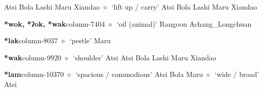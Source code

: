          Atsi 
\hspace{1ex}
         Bola 
\hspace{1ex}
         Lashi 
\hspace{1ex}
         Maru 
\hspace{1ex}
         Xiandao 
\hspace{1ex}
         $\diamond$~`lift up / carry'
         Atsi 
\hspace{1ex}
         Bola 
\hspace{1ex}
         Lashi 
\hspace{1ex}
         Maru 
\hspace{1ex}
         Xiandao 
  \item {\footnotesize \textbf{*wok, *ʔok, *wak}}{\tiny column-7404}
         $\diamond$~`oil (animal)'
         Rangoon 
\hspace{1ex}
         Achang\_Longchuan 
  \item {\footnotesize \textbf{*lak}}{\tiny column-8037}
         $\diamond$~`pestle'
         Maru 
  \item {\footnotesize \textbf{*wak}}{\tiny column-9920}
         $\diamond$~`shoulder'
         Atsi 
\hspace{1ex}
         Atsi 
\hspace{1ex}
         Bola 
\hspace{1ex}
         Lashi 
\hspace{1ex}
         Maru 
\hspace{1ex}
         Xiandao 
  \item {\footnotesize \textbf{*lam}}{\tiny column-10370}
         $\diamond$~`spacious / commodious'
         Atsi 
\hspace{1ex}
         Bola 
\hspace{1ex}
         Maru 
\hspace{1ex}
         $\diamond$~`wide / broad'
         Atsi 
